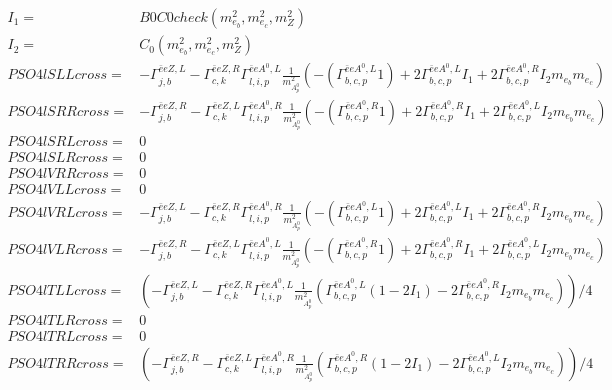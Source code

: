 \documentclass[A4,landscape]{article}
\begin{document}
\begin{align} 
I_1= & B0C0check(m^2_{e_{{b}}}, m^2_{e_{{c}}}, m^2_{Z}) \\ 
I_2= & C_0(m^2_{e_{{b}}}, m^2_{e_{{c}}}, m^2_{Z}) \\ 
  PSO4lSLLcross= &  - \Gamma^{\bar{e}e Z ,L} _{j, b} - \Gamma^{\bar{e}e Z ,R} _{c, k} \Gamma^{\bar{e}e A^0 ,L}_{l, i, p} \frac{1}{m^2_{A^0_{{p}}}} (-(\Gamma^{\bar{e}e A^0 ,L}_{b, c, p} 1) + 2 \Gamma^{\bar{e}e A^0 ,L}_{b, c, p} I_1 + 2 \Gamma^{\bar{e}e A^0 ,R}_{b, c, p} I_2 m_{e_{{b}}} m_{e_{{c}}}) \\ 
  PSO4lSRRcross= &  - \Gamma^{\bar{e}e Z ,R} _{j, b} - \Gamma^{\bar{e}e Z ,L} _{c, k} \Gamma^{\bar{e}e A^0 ,R}_{l, i, p} \frac{1}{m^2_{A^0_{{p}}}} (-(\Gamma^{\bar{e}e A^0 ,R}_{b, c, p} 1) + 2 \Gamma^{\bar{e}e A^0 ,R}_{b, c, p} I_1 + 2 \Gamma^{\bar{e}e A^0 ,L}_{b, c, p} I_2 m_{e_{{b}}} m_{e_{{c}}}) \\ 
  PSO4lSRLcross= & 0 \\ 
  PSO4lSLRcross= & 0 \\ 
  PSO4lVRRcross= & 0 \\ 
  PSO4lVLLcross= & 0 \\ 
  PSO4lVRLcross= &  - \Gamma^{\bar{e}e Z ,L} _{j, b} - \Gamma^{\bar{e}e Z ,R} _{c, k} \Gamma^{\bar{e}e A^0 ,R}_{l, i, p} \frac{1}{m^2_{A^0_{{p}}}} (-(\Gamma^{\bar{e}e A^0 ,L}_{b, c, p} 1) + 2 \Gamma^{\bar{e}e A^0 ,L}_{b, c, p} I_1 + 2 \Gamma^{\bar{e}e A^0 ,R}_{b, c, p} I_2 m_{e_{{b}}} m_{e_{{c}}}) \\ 
  PSO4lVLRcross= &  - \Gamma^{\bar{e}e Z ,R} _{j, b} - \Gamma^{\bar{e}e Z ,L} _{c, k} \Gamma^{\bar{e}e A^0 ,L}_{l, i, p} \frac{1}{m^2_{A^0_{{p}}}} (-(\Gamma^{\bar{e}e A^0 ,R}_{b, c, p} 1) + 2 \Gamma^{\bar{e}e A^0 ,R}_{b, c, p} I_1 + 2 \Gamma^{\bar{e}e A^0 ,L}_{b, c, p} I_2 m_{e_{{b}}} m_{e_{{c}}}) \\ 
  PSO4lTLLcross= & ( - \Gamma^{\bar{e}e Z ,L} _{j, b} - \Gamma^{\bar{e}e Z ,R} _{c, k} \Gamma^{\bar{e}e A^0 ,L}_{l, i, p} \frac{1}{m^2_{A^0_{{p}}}} (\Gamma^{\bar{e}e A^0 ,L}_{b, c, p} (1 - 2 I_1) - 2 \Gamma^{\bar{e}e A^0 ,R}_{b, c, p} I_2 m_{e_{{b}}} m_{e_{{c}}}))/4 \\ 
  PSO4lTLRcross= & 0 \\ 
  PSO4lTRLcross= & 0 \\ 
  PSO4lTRRcross= & ( - \Gamma^{\bar{e}e Z ,R} _{j, b} - \Gamma^{\bar{e}e Z ,L} _{c, k} \Gamma^{\bar{e}e A^0 ,R}_{l, i, p} \frac{1}{m^2_{A^0_{{p}}}} (\Gamma^{\bar{e}e A^0 ,R}_{b, c, p} (1 - 2 I_1) - 2 \Gamma^{\bar{e}e A^0 ,L}_{b, c, p} I_2 m_{e_{{b}}} m_{e_{{c}}}))/4 \\ 
\end{align} 
\end{document}
